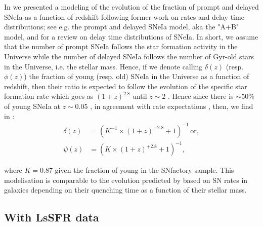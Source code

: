 \documentclass[]{aa} %
\begin{document}
In \cite{rigault2018} we presented a modeling of the evolution of the fraction
of prompt and delayed SNeIa as a function of redshift following former work on
rates and delay time distributions; see e.g. the prompt and delayed SNeIa model,
aka the "A+B" model,
\cite{mannucci2005,scannapieco2005,sullivan2006,aubourg2008} and
\cite{maozmannucci2014} for a review on delay time distributions of SNeIa. In
short, we assume that the number of prompt SNeIa follows the star formation
activity in the Universe while the number of delayed SNeIa follows the number of
Gyr-old stars in the Universe, i.e. the stellar mass. Hence, if we denote
calling $\delta(z)$ (resp. $\phi(z)$) the fraction of young (resp. old) SNeIa in
the Universe as a function of redshift, then their ratio is expected to follow
the evolution of the specific star formation rate which goes as $(1+z)^{2.8}$
until $z\sim2$ \citep{tasca2015}. Hence since there is  $\sim50\%$ of young
SNeIa at $z\sim0.05$ \citep{rigault2013,rigault2018}, in agreement with rate
expectations \citep{mannucci2006,rodney2014}, then, we find in
\cite{rigault2018}:
\begin{align}
    \label{eq:delta}
    \delta(z) & = \left( K^{-1} \times (1+z)^{-2.8} +1 \right)^{-1}\,
                  \mathrm{or,}\\
    \psi(z) & = \left( K \times (1+z)^{+2.8} +1 \right)^{-1},
\end{align}

where $K=0.87$ given the fraction of young in the SNfactory sample. This
modelisation is comparable to the evolution predicted by \cite{childress2014}
based on SN rates in galaxies depending on their quenching time as a function of
their stellar mass.

\subsection{With LsSFR data}
\label{sec:modelpy}
\end{document}
